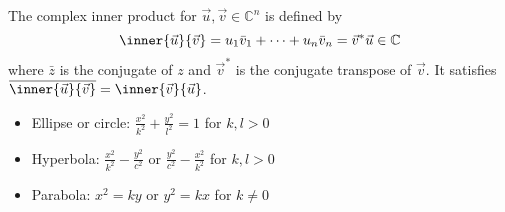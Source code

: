 \documentclass[10pt, a4paper]{article}
\begin{document}
\begin{multicols}{2}
    The complex inner product for \(\vec{u}, \vec{v} \in \mathbb{C}^n\) is defined by
    \[\inner{\vec{u}}{\vec{v}} = u_1 \bar v_1 + \cdots + u_n \bar v_n = \vec{v}^{*} \vec{u} \in \mathbb{C}\]
    where \(\bar z\) is the conjugate of \(z\) and \(\vec{v}^{*}\) is the conjugate transpose of \(\vec{v}\). It satisfies
    \(\overline{\inner{\vec{u}}{\vec{v}}} = \inner{\vec{v}}{\vec{u}}\).

    \begin{itemize}
        \item Ellipse or circle: \(\frac{x^2}{k^2} + \frac{y^2}{l^2} = 1\) for \(k, l > 0\)
        \item Hyperbola: \(\frac{x^2}{k^2} - \frac{y^2}{c^2}\) or \(\frac{y^2}{c^2} - \frac{x^2}{k^2}\) for \(k, l > 0\)
        \item Parabola: \(x^2 = ky\) or \(y^2 = kx\) for \(k \neq 0\)
    \end{itemize}
\end{multicols}

\end{document}
